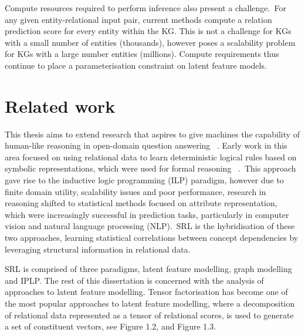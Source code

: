 \noindent Compute resources required to perform inference also present a challenge.\ For any given entity-relational input pair, current methods compute a relation prediction score for every entity within the KG. This is not a challenge for KGs with a small number of entities (thousands), however poses a scalability problem for KGs with a large number entities (millions). Compute requirements thus continue to place a parameterisation constraint on latent feature models. 



\section{Related work} %

\noindent This thesis aims to extend research that aspires to give machines the capability of human-like reasoning in open-domain question answering \unskip~\citep{hakimov2019evaluating}. Early work in this area focused on using relational data to learn deterministic logical rules based on symbolic representations, which were used for formal reasoning \unskip~\citep{hohenecker2017deep}.\ This approach gave rise to the inductive logic programming (ILP) paradigm, however due to finite domain utility, scalability issues and poor performance, research in reasoning shifted to statistical methods focused on attribute representation, which were increasingly successful in prediction tasks, particularly in computer vision and natural language processing (NLP).\ SRL is the hybridisation of these two approaches, learning statistical correlations between concept dependencies by leveraging structural information in relational data. \par

\noindent SRL is comprised of three paradigms, latent feature modelling, graph modelling and IPLP. The rest of this dissertation is concerned with the analysis of approaches to latent feature modelling. Tensor factorisation has become one of the most popular approaches to latent feature modelling, where a decomposition of relational data represented as a tensor of relational scores, is used to generate a set of constituent vectors, see Figure 1.2, and Figure 1.3. \par

